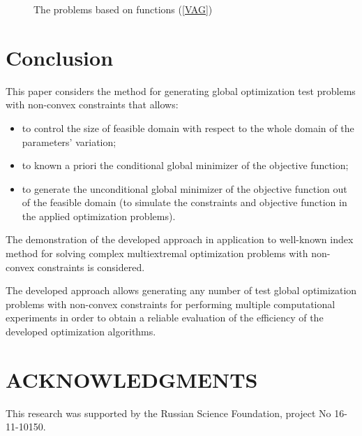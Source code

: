 \documentclass{aip-cp}
\begin{document}
\begin{figure}
\begin{minipage}{0.5\linewidth}
\end{minipage}
\hfill
\begin{minipage}{0.5\linewidth}
\end{minipage}
\caption{The problems based on functions (\ref{VAG}) }
\label{fig:VAG}
\end{figure}


\section {Conclusion}

This paper considers the method for generating global optimization test problems with non-convex constraints that allows:
\begin{itemize}
	\item to control the size of feasible domain with respect to the whole domain of the parameters' variation;
	\item to known a priori the conditional global minimizer of the objective function;
	\item to generate the unconditional global minimizer of the objective function out of the feasible domain (to simulate the constraints and objective function in the applied optimization problems).
\end{itemize}

The demonstration of the developed approach in application to well-known index method for solving complex multiextremal optimization problems with non-convex constraints is considered.

The developed approach allows generating any number of test global optimization problems with non-convex constraints for performing multiple computational experiments in order to obtain a reliable evaluation of the efficiency of the developed optimization algorithms.

\section{ACKNOWLEDGMENTS}
This research was supported by the Russian Science Foundation, project No 16-11-10150.


%
%
\end{document}
